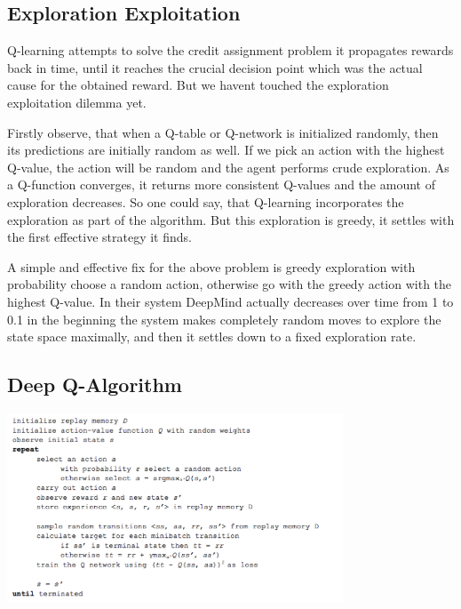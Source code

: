 \documentclass[twoside,letterpaper]{article}
\begin{document}
{{\subsection[Exploration Exploitation]{\rmfamily\bfseries\color{black}
Exploration Exploitation}
Q-learning attempts to solve the credit assignment problem it propagates rewards back in time, until it reaches the crucial decision point which was the actual cause for the obtained reward. But we havent touched the exploration exploitation dilemma yet.

Firstly observe, that when a Q-table or Q-network is initialized randomly, then its predictions are initially random as well. If we pick an action with the highest Q-value, the action will be random and the agent performs crude exploration. As a Q-function converges, it returns more consistent Q-values and the amount of exploration decreases. So one could say, that Q-learning incorporates the exploration as part of the algorithm. But this exploration is greedy, it settles with the first effective strategy it finds.

A simple and effective fix for the above problem is greedy exploration with probability choose a random action, otherwise go with the greedy action with the highest Q-value. In their system DeepMind actually decreases over time from 1 to 0.1 in the beginning the system makes completely random moves to explore the state space maximally, and then it settles down to a fixed exploration rate.

\subsection[Deep Q-Algorithm]{\rmfamily\bfseries\color{black}
Deep Q-Algorithm}

{\color{black}
\begin{centering}
\includegraphics[width=10cm]{images/deep3.png}\\
\end{centering}

}}}
\end{document}
